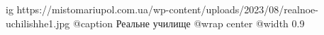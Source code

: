  
 
 
 
 

\ifcmt
  ig https://mistomariupol.com.ua/wp-content/uploads/2023/08/realnoe-uchilishhe1.jpg
	@caption Реальне училище
  @wrap center
  @width 0.9
\fi
